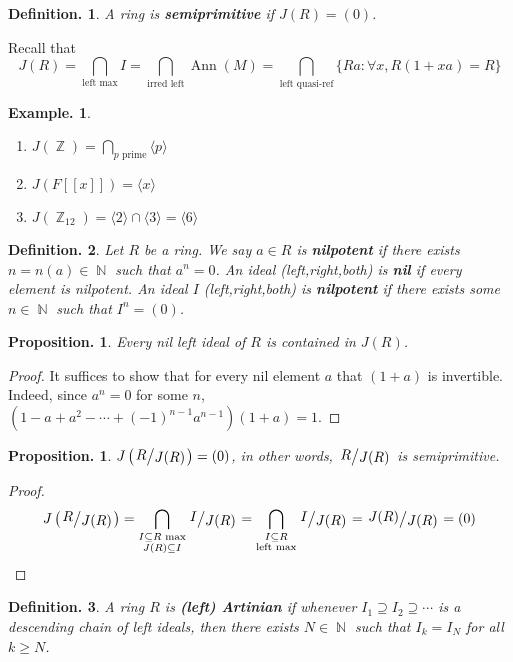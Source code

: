 \documentclass[11pt, a4paper]{memoir}
\DeclareMathOperator{\N}{{\mathbb{N}}}
\DeclareMathOperator{\Z}{{\mathbb{Z}}}
\theoremstyle{change}
\newtheorem{proposition}[theorem]{Proposition.}
\theoremstyle{plain}
\theoremstyle{nonumberplain}
\newtheorem{definition}{Definition.}
\newtheorem{example}{Example.}
\newtheorem{proof}{Proof}
\DeclareMathOperator{\Ann}{Ann}
\newcommand{\quot}[2]{\mathchoice{\left.\raisebox{0.14em}{$#1$}\middle/\raisebox{-0.14em}{$#2$}\right.}
                                 {\left.\raisebox{0.08em}{$#1$}\middle/\raisebox{-0.08em}{$#2$}\right.}
                                 {\left.\raisebox{0.03em}{$#1$}\middle/\raisebox{-0.03em}{$#2$}\right.}
                                 {\left.\raisebox{0em}{$#1$}\middle/\raisebox{0em}{$#2$}\right.}}
\numberwithin{equation}{section}
\begin{document}
\begin{definition}
    A ring is \textbf{semiprimitive} if $J(R)=(0)$.
\end{definition}
Recall that
\begin{equation*}
    J(R)=\bigcap_{\text{left max}}I = \bigcap_{\text{irred left}}\Ann(M) = \bigcap_{\text{left quasi-ref}}\{Ra:\forall x, R(1+xa)=R\}
\end{equation*}
\begin{example}
    \begin{enumerate}
        \item $J(\Z)=\bigcap_{p\text{ prime}}\langle p\rangle$
        \item $J(F[[x]])=\langle x\rangle$
        \item $J(\Z_{12})=\langle 2\rangle\cap\langle 3\rangle=\langle 6\rangle$
    \end{enumerate}
\end{example}
\begin{definition}
    Let $R$ be a ring.
    We say $a\in R$ is \textbf{nilpotent} if there exists $n=n(a)\in\N$ such that $a^n=0$.
    An ideal (left,right,both) is \textbf{nil} if every element is nilpotent.
    An ideal $I$ (left,right,both) is \textbf{nilpotent} if there exists some $n\in\N$ such that $I^n=(0)$.
\end{definition}
\begin{proposition}
    Every nil left ideal of $R$ is contained in $J(R)$.
\end{proposition}
\begin{proof}
    It suffices to show that for every nil element $a$ that $(1+a)$ is invertible.
    Indeed, since $a^n=0$ for some $n$, $(1-a+a^2-\cdots+(-1)^{n-1}a^{n-1})(1+a)=1$.
\end{proof}
\begin{proposition}
    $J\left(\quot{R}{J(R)}\right)=(0)$, in other words, $\quot{R}{J(R)}$ is semiprimitive.
\end{proposition}
\begin{proof}
    \begin{equation*}
        J\left(\quot{R}{J(R)}\right) = \bigcap_{\substack{I\subseteq R\text{ max}\\J(R)\subseteq I}}\quot{I}{J(R)} = \bigcap_{\substack{I\subseteq R\\\text{left max}}}\quot{I}{J(R)}=\quot{J(R)}{J(R)}=(0)
    \end{equation*}
\end{proof}
\begin{definition}
    A ring $R$ is \textbf{(left) Artinian} if whenever $I_1\supseteq I_2\supseteq\cdots$ is a descending chain of left ideals, then there exists $N\in\N$ such that $I_k=I_N$ for all $k\geq N$.
\end{definition}
\end{document}
